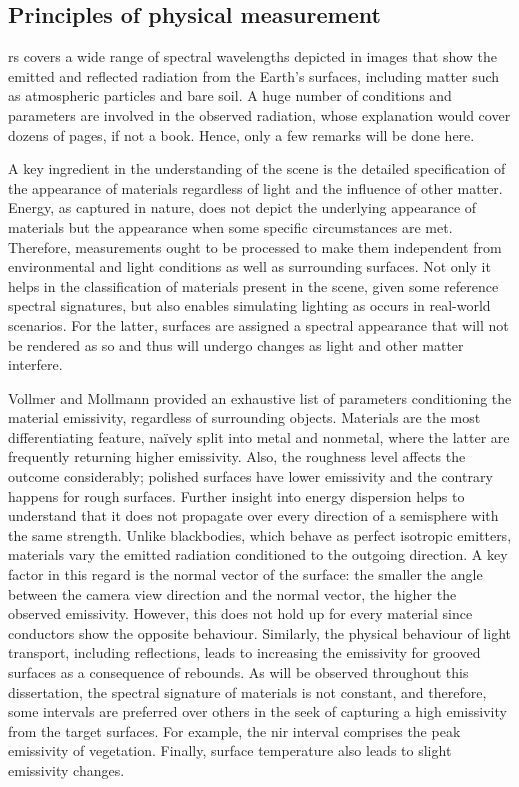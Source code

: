\subsection{Principles of physical measurement}

\acrshort{rs} covers a wide range of spectral wavelengths depicted in images that show the emitted and reflected radiation from the Earth's surfaces, including matter such as atmospheric particles and bare soil. A huge number of conditions and parameters are involved in the observed radiation, whose explanation would cover dozens of pages, if not a book. Hence, only a few remarks will be done here. 

A key ingredient in the understanding of the scene is the detailed specification of the appearance of materials regardless of light and the influence of other matter. Energy, as captured in nature, does not depict the underlying appearance of materials but the appearance when some specific circumstances are met. Therefore, measurements ought to be processed to make them independent from environmental and light conditions as well as surrounding surfaces. Not only it helps in the classification of materials present in the scene, given some reference spectral signatures, but also enables simulating lighting as occurs in real-world scenarios. For the latter, surfaces are assigned a spectral appearance that will not be rendered as so and thus will undergo changes as light and other matter interfere. 

Vollmer and Mollmann \cite{vollmer_infrared_2017} provided an exhaustive list of parameters conditioning the material emissivity, regardless of surrounding objects. Materials are the most differentiating feature, naïvely split into metal and nonmetal, where the latter are frequently returning higher emissivity. Also, the roughness level affects the outcome considerably; polished surfaces have lower emissivity and the contrary happens for rough surfaces. Further insight into energy dispersion helps to understand that it does not propagate over every direction of a semisphere with the same strength. Unlike blackbodies, which behave as perfect isotropic emitters, materials vary the emitted radiation conditioned to the outgoing direction. A key factor in this regard is the normal vector of the surface: the smaller the angle between the camera view direction and the normal vector, the higher the observed emissivity. However, this does not hold up for every material since conductors show the opposite behaviour. Similarly, the physical behaviour of light transport, including reflections, leads to increasing the emissivity for grooved surfaces as a consequence of rebounds. As will be observed throughout this dissertation, the spectral signature of materials is not constant, and therefore, some intervals are preferred over others in the seek of capturing a high emissivity from the target surfaces. For example, the \acrshort{nir} interval comprises the peak emissivity of vegetation. Finally, surface temperature also leads to slight emissivity changes.

